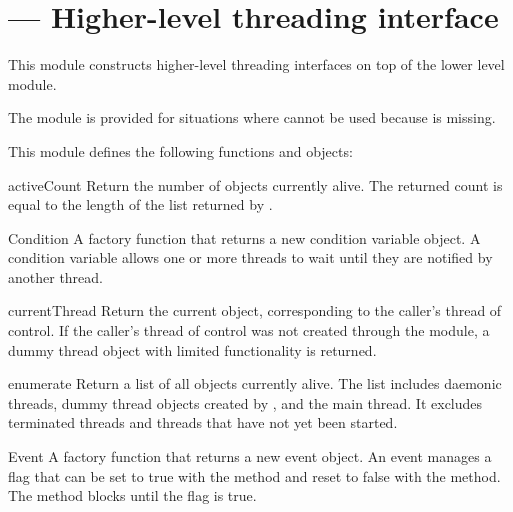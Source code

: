 \section{ ---
         Higher-level threading interface}



This module constructs higher-level threading interfaces on top of the 
lower level  module.

The  module is provided for
situations where  cannot be used because
 is missing.

This module defines the following functions and objects:

\begin{funcdesc}{activeCount}{}
Return the number of  objects currently alive.  The
returned count is equal to the length of the list returned by
.
\end{funcdesc}

\begin{funcdesc}{Condition}{}
A factory function that returns a new condition variable object.
A condition variable allows one or more threads to wait until they
are notified by another thread.
\end{funcdesc}

\begin{funcdesc}{currentThread}{}
Return the current  object, corresponding to the
caller's thread of control.  If the caller's thread of control was not
created through the
 module, a dummy thread object with limited functionality
is returned.
\end{funcdesc}

\begin{funcdesc}{enumerate}{}
Return a list of all  objects currently alive.  The list
includes daemonic threads, dummy thread objects created by
, and the main thread.  It excludes
terminated threads and threads that have not yet been started.
\end{funcdesc}

\begin{funcdesc}{Event}{}
A factory function that returns a new event object.  An event manages
a flag that can be set to true with the  method and
reset to false with the  method.  The 
method blocks until the flag is true.
\end{funcdesc}

